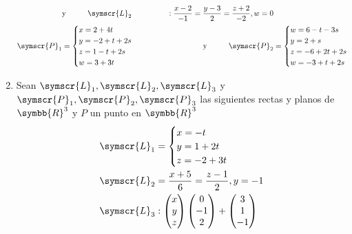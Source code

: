 \documentclass{article}
\def\fancyL{\symscr{L}}
\def\fancyP{\symscr{P}}
\def\realR{\symbb{R}}
\begin{document}
\begin{enumerate}
\[\begin{aligned}
            &\text{y}
            \hspace{1cm}
            \fancyL_2 &:
            \frac{x - 2}{-1} =
            \frac{y - 3}{2} =
            \frac{z + 2}{-2}, w = 0 \\
            \fancyP_1 &=
            \begin{cases}
                x = 2 + 4t \\
                y = -2 + t + 2s \\
                z = 1 -t + 2s \\
                w = 3 + 3t
            \end{cases}
            \hspace{1cm}
            &\text{y}
            \hspace{1cm}
            \fancyP_2 &=
            \begin{cases}
                w = 6 - t - 3s \\
                y = 2 + s \\
                z = -6 + 2t + 2s \\
                w = -3 + t + 2s
            \end{cases}
        \end{aligned}
    \]
\item Sean \(\fancyL_1, \fancyL_2, \fancyL_3\) y \(\fancyP_1, \fancyP_2, \fancyP_3\) las siguientes rectas y planos de \(\realR^3\) y \(P\) un punto en \(\realR^3\)
    \[
        \begin{aligned}
            \fancyL_1 &=
            \begin{cases}
                x = -t \\
                y = 1 + 2t \\
                z = -2 + 3t
            \end{cases} \\
            \fancyL_2 &=
            \frac{x + 5}{6} =
            \frac{z - 1}{2},
            y = -1 \\
            \fancyL_3 &: 
            \begin{pmatrix}x \\ y \\ z\end{pmatrix}
            \begin{pmatrix}0 \\ -1 \\ 2\end{pmatrix}
            +
            \begin{pmatrix}3 \\ 1 \\ -1\end{pmatrix}

\end{aligned}\]
\end{enumerate}
\end{document}
